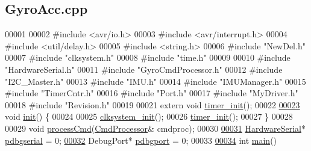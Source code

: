 \hypertarget{_gyro_acc_8cpp_source}{
\subsection{GyroAcc.cpp}
}

\begin{DoxyCode}
00001 
00002 \textcolor{preprocessor}{#include <avr/io.h>}
00003 \textcolor{preprocessor}{#include <avr/interrupt.h>}
00004 \textcolor{preprocessor}{#include <util/delay.h>}
00005 \textcolor{preprocessor}{#include <string.h>}
00006 \textcolor{preprocessor}{#include "NewDel.h"}
00007 \textcolor{preprocessor}{#include "clksystem.h"}
00008 \textcolor{preprocessor}{#include "time.h"}
00009 
00010 \textcolor{preprocessor}{#include "HardwareSerial.h"}
00011 \textcolor{preprocessor}{#include "GyroCmdProcessor.h"}
00012 \textcolor{preprocessor}{#include "I2C\_Master.h"}
00013 \textcolor{preprocessor}{#include "IMU.h"}
00014 \textcolor{preprocessor}{#include "IMUManager.h"}
00015 \textcolor{preprocessor}{#include "TimerCntr.h"}
00016 \textcolor{preprocessor}{#include "Port.h"}
00017 \textcolor{preprocessor}{#include "MyDriver.h"}
00018 \textcolor{preprocessor}{#include "Revision.h"}
00019 
00021 \textcolor{keyword}{extern} \textcolor{keywordtype}{void} \hyperlink{_gyro_acc_8cpp_a896a4c37c6ecf8868ef0dc758e5a598c}{timer_init}();
00022 
\hypertarget{_gyro_acc_8cpp_source_l00023}{}\hyperlink{_gyro_acc_8cpp_a02fd73d861ef2e4aabb38c0c9ff82947}{00023} \textcolor{keywordtype}{void} \hyperlink{_gyro_acc_8cpp_a02fd73d861ef2e4aabb38c0c9ff82947}{init}() \{
00024 
00025     \hyperlink{clksystem_8cpp_a098d30ebaad7a94505407605314930e5}{clksystem_init}();
00026     \hyperlink{_gyro_acc_8cpp_a896a4c37c6ecf8868ef0dc758e5a598c}{timer_init}();
00027 \}
00028 
00029 \textcolor{keywordtype}{void} \hyperlink{_gyro_acc_8cpp_a04545dccf7a169ce181b81c5376c9ec7}{processCmd}(\hyperlink{class_cmd_processor}{CmdProcessor}& cmdproc);
00030 
\hypertarget{_gyro_acc_8cpp_source_l00031}{}\hyperlink{_port_8cpp_a953e918236b1fd18b8f07bad1217ecbe}{00031} \hyperlink{class_hardware_serial}{HardwareSerial}* \hyperlink{_gyro_acc_8cpp_a953e918236b1fd18b8f07bad1217ecbe}{pdbgserial} = 0;
\hypertarget{_gyro_acc_8cpp_source_l00032}{}\hyperlink{_gyro_acc_8cpp_ab6b6625a30d84db3519866cb8c32dd39}{00032} DebugPort*      \hyperlink{_gyro_acc_8cpp_ab6b6625a30d84db3519866cb8c32dd39}{pdbgport} = 0;
00033 
\hypertarget{_gyro_acc_8cpp_source_l00034}{}\hyperlink{_gyro_acc_8cpp_ae66f6b31b5ad750f1fe042a706a4e3d4}{00034} \textcolor{keywordtype}{int} \hyperlink{_gyro_acc_8cpp_ae66f6b31b5ad750f1fe042a706a4e3d4}{main}()

\end{DoxyCode}

